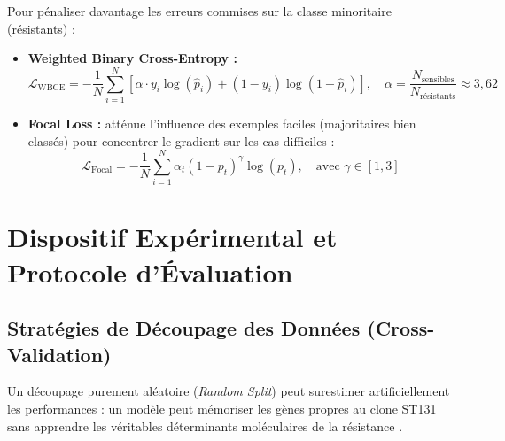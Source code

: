\documentclass[11pt,a4paper]{article}
\begin{document}
Pour pénaliser davantage les erreurs commises sur la classe minoritaire (résistants) :
\begin{itemize}[leftmargin=*, label=$\bullet$]
    \item \textbf{Weighted Binary Cross-Entropy \citep{he2009learning} :}
    \[
    \mathcal{L}_{\text{WBCE}} = -\frac{1}{N}\sum_{i=1}^N \left[ \alpha \cdot y_i \log(\hat{p}_i) + (1-y_i) \log(1-\hat{p}_i) \right], \quad \alpha = \frac{N_{\text{sensibles}}}{N_{\text{résistants}}} \approx 3,62
    \]
    \item \textbf{Focal Loss \citep{lin2017focal} :} atténue l'influence des exemples faciles (majoritaires bien classés) pour concentrer le gradient sur les cas difficiles :
    \[
    \mathcal{L}_{\text{Focal}} = -\frac{1}{N}\sum_{i=1}^N \alpha_t (1 - p_t)^\gamma \log(p_t), \quad \text{avec } \gamma \in [1, 3]
    \]
\end{itemize}

\section{Dispositif Expérimental et Protocole d'Évaluation}

\subsection{Stratégies de Découpage des Données (Cross-Validation)}

\begin{warningbox}
Un découpage purement aléatoire (\textit{Random Split}) peut surestimer artificiellement les performances : un modèle peut mémoriser les gènes propres au clone ST131 sans apprendre les véritables déterminants moléculaires de la résistance \citep{earle2016identifying,lees2016sequence}.
\end{warningbox}
\end{document}
